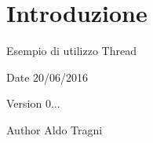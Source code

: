 \hypertarget{index_intro}{}\section{Introduzione}\label{index_intro}
Esempio di utilizzo Thread

\begin{DoxyDate}{Date}
20/06/2016 
\end{DoxyDate}
\begin{DoxyVersion}{Version}
0... 
\end{DoxyVersion}
\begin{DoxyAuthor}{Author}
Aldo Tragni 
\end{DoxyAuthor}
